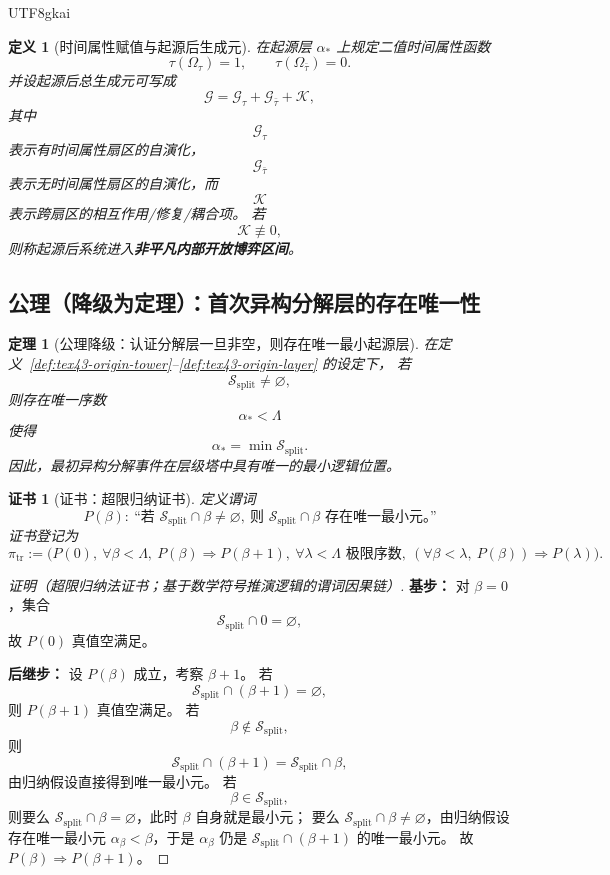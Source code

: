 \documentclass[12pt]{article}
\newtheorem{definition}{定义}[section]
\newtheorem{theorem}{定理}[section]
\newtheorem{Certificate}{证书}[section]
\begin{document}
\begin{CJK*}{UTF8}{gkai}
\begin{definition}[时间属性赋值与起源后生成元]
\label{def:tex43-origin-generator}
在起源层 $\alpha_\ast$ 上规定二值时间属性函数
\[
  \tau(\Omega_\tau)=1,
  \qquad
  \tau(\Omega_{\bar\tau})=0.
\]
并设起源后总生成元可写成
\[
  \mathcal G
  =
  \mathcal G_\tau+\mathcal G_{\bar\tau}+\mathcal K,
\]
其中
\[
  \mathcal G_\tau
\]
表示有时间属性扇区的自演化，
\[
  \mathcal G_{\bar\tau}
\]
表示无时间属性扇区的自演化，而
\[
  \mathcal K
\]
表示跨扇区的相互作用/修复/耦合项。
若
\[
  \mathcal K\not\equiv 0,
\]
则称起源后系统进入\textbf{非平凡内部开放博弈区间}。
\end{definition}

\subsection{公理（降级为定理）：首次异构分解层的存在唯一性}
\label{subsec:tex43-ch4-axiom-downgrade}

\begin{theorem}[公理降级：认证分解层一旦非空，则存在唯一最小起源层]
\label{thm:tex43-origin-existence}
在定义~\ref{def:tex43-origin-tower}--\ref{def:tex43-origin-layer} 的设定下，
若
\[
  \mathcal S_{\mathrm{split}}\neq \varnothing,
\]
则存在唯一序数
\[
  \alpha_\ast<\Lambda
\]
使得
\[
  \alpha_\ast=\min \mathcal S_{\mathrm{split}}.
\]
因此，最初异构分解事件在层级塔中具有唯一的最小逻辑位置。
\end{theorem}

\begin{Certificate}[证书：超限归纳证书]
\label{cert:tex43-origin-existence}
定义谓词
\[
  P(\beta):
  \ \text{“若 }\mathcal S_{\mathrm{split}}\cap \beta\neq\varnothing,\ \text{则 }\mathcal S_{\mathrm{split}}\cap
    \beta\text{ 存在唯一最小元。”}
\]
证书登记为
\[
  \pi_{\mathrm{tr}}
  :=
  \bigl(P(0),\ \forall\beta<\Lambda,\ P(\beta)\Rightarrow P(\beta+1),\ \forall\lambda<\Lambda\text{ 极限序数},\
    (\forall\beta<\lambda,\ P(\beta))\Rightarrow P(\lambda)\bigr).
\]
\end{Certificate}

\begin{proof}[证明（超限归纳法证书；基于数学符号推演逻辑的谓词因果链）]
\textbf{基步：}
对 $\beta=0$，集合
\[
  \mathcal S_{\mathrm{split}}\cap 0=\varnothing,
\]
故 $P(0)$ 真值空满足。

\textbf{后继步：}
设 $P(\beta)$ 成立，考察 $\beta+1$。
若
\[
  \mathcal S_{\mathrm{split}}\cap (\beta+1)=\varnothing,
\]
则 $P(\beta+1)$ 真值空满足。
若
\[
  \beta\notin \mathcal S_{\mathrm{split}},
\]
则
\[
  \mathcal S_{\mathrm{split}}\cap(\beta+1)=\mathcal S_{\mathrm{split}}\cap\beta,
\]
由归纳假设直接得到唯一最小元。
若
\[
  \beta\in \mathcal S_{\mathrm{split}},
\]
则要么 $\mathcal S_{\mathrm{split}}\cap\beta=\varnothing$，此时 $\beta$ 自身就是最小元；
要么 $\mathcal S_{\mathrm{split}}\cap\beta\neq\varnothing$，由归纳假设存在唯一最小元 $\alpha_\beta<\beta$，于是 $\alpha_\beta$ 仍是
  $\mathcal S_{\mathrm{split}}\cap(\beta+1)$ 的唯一最小元。
故 $P(\beta)\Rightarrow P(\beta+1)$。


\end{proof}
\end{CJK*}
\end{document}
